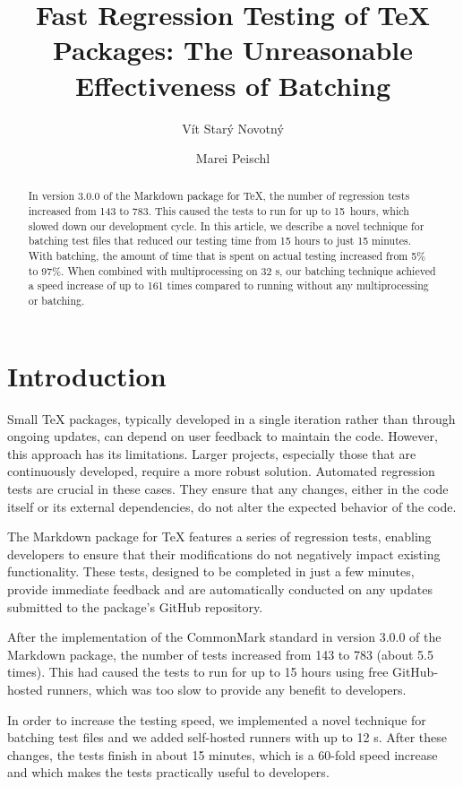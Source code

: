 \documentclass[final]{ltugboat}
\title{Fast Regression Testing of \TeX{} Packages: The Unreasonable Effectiveness of Batching}
\author{Vít Starý Novotný}
\author{Marei Peischl}
\begin{document}
\maketitle

\begin{abstract}
In version 3.0.0 of the Markdown package for \TeX, the number of regression tests increased from 143 to 783. This caused the tests to run for up to 15~hours, which slowed down our development cycle.
In this article, we describe a novel technique for batching test files that reduced our testing time from 15 hours to just 15 minutes. With batching, the amount of time that is spent on actual testing increased from 5\% to 97\%. When combined with multiprocessing on 32 s, our batching technique achieved a speed increase of up to 161 times compared to running without any multiprocessing or batching.
\end{abstract}

\section{Introduction}
Small \TeX{} packages, typically developed in a single iteration rather than through ongoing updates, can depend on user feedback to maintain the code. However, this approach has its limitations. Larger projects, especially those that are continuously developed, require a more robust solution. Automated regression tests are crucial in these cases. They ensure that any changes, either in the code itself or its external dependencies, do not alter the expected behavior of the code.

The Markdown package for \TeX{} features a series of regression tests, enabling developers to ensure that their modifications do not negatively impact existing functionality. These tests, designed to be completed in just a few minutes, provide immediate feedback and are automatically conducted on any updates submitted to the package's GitHub repository.

After the implementation of the CommonMark standard in version 3.0.0 of the Markdown package, the number of tests increased from 143 to 783 (about 5.5 times). This had caused the tests to run for up to 15 hours using free GitHub-hosted runners, which was too slow to provide any benefit to developers.

In order to increase the testing speed, we implemented a novel technique for batching test files and we added self-hosted runners with up to 12 s. After these changes, the tests finish in about 15 minutes, which is a 60-fold speed increase and which makes the tests practically useful to developers.
\end{document}
